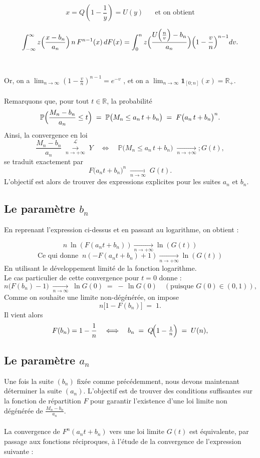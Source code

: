 \documentclass{article}
\theoremstyle{plain}
\theoremstyle{definition}
\theoremstyle{plain}
\begin{document}
\[
x = Q(1-\frac{1}{y}) = U(y) \; \; \; \; \; \; \text{et on obtient}
\]

\begin{equation}\label{eq:1.1}
    \int_{-\infty}^{\infty} z\Bigl(\frac{x-b_n}{a_n}\Bigr) \, n \, F^{n-1}(x)\,dF(x)
    =\int_{0}^{n} z\Bigl(\frac{U\Bigl(\frac{n}{v}\Bigr)-b_n}{a_n}\Bigr)
    \Bigl(1-\frac{v}{n}\Bigr)^{n-1}dv.
\end{equation}
\\
\\
Or, on a $\lim_{n \to \infty} ( 1 - \frac{v}{n})^{n-1} = e^{-v}$ , et on a $\lim_{n \to \infty} \mathbf{1}_{[0;n]}(x) = \mathbb{R}_{+}$.
\\
\\
Remarquons que, pour tout $t\in\mathbb R$, la probabilité
\[
\mathbb{P}  \Bigl(\frac{M_n - b_n}{a_n} \le t\Bigr)
\;=\;
\mathbb{P} \bigl(M_n \le a_n\,t + b_n\bigr)
\;=\;
F\bigl(a_n\,t + b_n\bigr)^{n}.
\]
Ainsi, la convergence en loi 
\[
\frac{M_n - b_n}{a_n}\;\overset{\mathcal{L}}{\xrightarrow[n\to +\infty]{}}\;Y
\quad\Longleftrightarrow\quad
\mathbb{P} \bigl(M_n \le a_n\,t + b_n\bigr)
\;\xrightarrow[n\to +\infty]{};
G(t),
\]
se traduit exactement par
\[
F\bigl(a_n t + b_n\bigr)^{n}
\;\xrightarrow[n\to\infty]{}\;
G(t).
\]
L'objectif est alors de trouver des expressions explicites pour les suites \(a_n\) et \(b_n\).

\subsection{Le paramètre $b_n$}

\noindent En reprenant l'expression ci-dessus et en passant au logarithme, on obtient :

\[
n \: \ln (F(a_n t + b_n)) \xrightarrow[n\to +\infty]{} \ln (G(t))
\]
\[
\text{Ce qui donne} \; \; n(- F(a_n t + b_n) + 1) \xrightarrow[n\to +\infty]{} \ln (G(t))
\]
En utilisant le développement limité de la fonction logarithme. 
\\
Le cas particulier de cette convergence pour $t=0$ donne :
\[
n\bigl(F(b_n)-1\bigr)\;\xrightarrow[n\to\infty]{}\;\ln G(0)
\;=\;-\,\ln G(0)\quad(\text{puisque }G(0)\in(0,1)),
\]
Comme on souhaite une limite non-dégénérée, on impose
\[
n\bigl[1 - F(b_n)\bigr] \;=\; 1.
\]
Il vient alors
\[
F(b_n)=1-\frac1n
\quad\Longleftrightarrow\quad
b_n \;=\; Q\!\Bigl(1-\tfrac1n\Bigr)
\;=\;U(n),
\]


\subsection{Le paramètre $a_n$}
Une fois la suite $(b_n)$ fixée comme précédemment, nous devons maintenant déterminer la suite $(a_n)$. L’objectif est de trouver des
 conditions suffisantes sur la fonction de répartition $F$ pour garantir l’existence d’une loi limite non dégénérée de $\frac{M_n - b_n}{a_n}$.
\\
\\
La convergence de $F^n(a_n t + b_n)$ vers une loi limite $G(t)$ est équivalente, par passage aux fonctions réciproques, à l’étude de la convergence de l’expression suivante :
\end{document}
